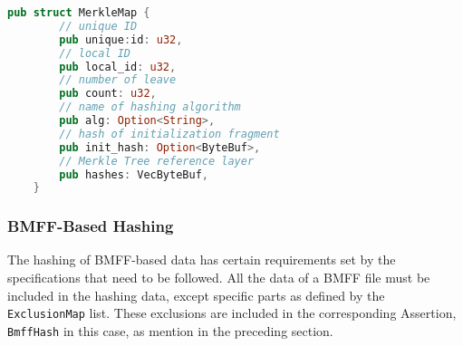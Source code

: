 \begin{minipage}{0.95\linewidth}
\begin{lstlisting}[caption={MerkleMap Rust Definition}, label=code:merkle_map, language=Rust, captionpos=b]
    pub struct MerkleMap {
        // unique ID
        pub unique:id: u32,
        // local ID
        pub local_id: u32,
        // number of leave
        pub count: u32,
        // name of hashing algorithm
        pub alg: Option<String>,
        // hash of initialization fragment
        pub init_hash: Option<ByteBuf>,
        // Merkle Tree reference layer
        pub hashes: VecByteBuf,
    }
\end{lstlisting}
\end{minipage}

\subsubsection{BMFF-Based Hashing}

The hashing of BMFF-based data has certain requirements set by the specifications that need to be followed. All the data of a BMFF file must be included in the hashing data, except specific parts as defined by the \texttt{ExclusionMap} list. These exclusions are included in the corresponding Assertion, \texttt{BmffHash} in this case, as mention in the preceding section.

